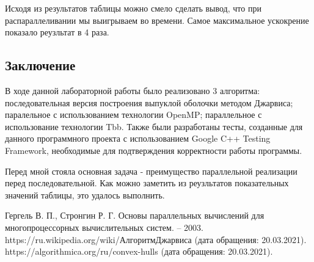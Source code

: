 \documentclass{report}
\begin{document}
\par Исходя из результатов таблицы можно смело сделать вывод, что при распараллеливании мы выигрываем во времени. Самое максимальное ускокрение показало реузльтат в 4 раза.
\newpage

\begin{center}
\section*{Заключение}
\end{center}
\par В ходе данной лабораторной работы было реализовано 3 алгоритма: последовательная версия построения выпуклой оболочки методом Джарвиса; паралельное с использованием технологии OpenMP; параллельное с использование технологии Tbb. Также были разработаны тесты, созданные для данного программного проекта с использованием Google C++ Testing Framework, необходимые для подтверждения корректности работы программы.
\par Перед мной стояла основная задача - преимущество параллельной реализации перед последовательной. Как можно заметить из реузльтатов показательных значений таблицы, это удалось выполнить.
\newpage

\begin{thebibliography}{}
 Гергель В. П., Стронгин Р. Г. Основы параллельных вычислений для многопроцессорных вычислительных систем. – 2003.
 https://ru.wikipedia.org/wiki/АлгоритмДжарвиса (дата обращения: 20.03.2021).
 https://algorithmica.org/ru/convex-hulls (дата обращения: 20.03.2021).
\end{thebibliography}{}
\newpage
\end{document}
